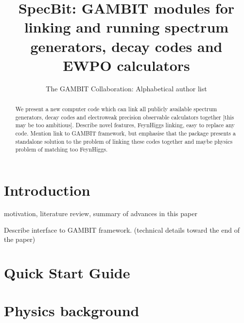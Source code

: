 \documentclass[11pt,a4paper]{article}
\title{SpecBit: GAMBIT modules for linking and running spectrum generators, decay codes and EWPO calculators}
\author{The GAMBIT Collaboration: Alphabetical author list} %
\begin{document}
\maketitle

\begin{abstract}
We present a new computer code which can link all publicly available spectrum generators, decay codes and electroweak precision observable calculators together 
[this may be too ambitious].
Describe novel features, FeynHiggs linking, easy to replace any code. Mention link to GAMBIT framework, but emphasise that the package presents a standalone solution to the problem of linking these codes together and maybe physics problem of matching too FeynHiggs.
\end{abstract}

\tableofcontents


\section{Introduction}

motivation, literature review, summary of advances in this paper




Describe interface to GAMBIT framework. (technical details toward the end of the paper)

\section{Quick Start Guide}


\section{Physics background}
\end{document}
